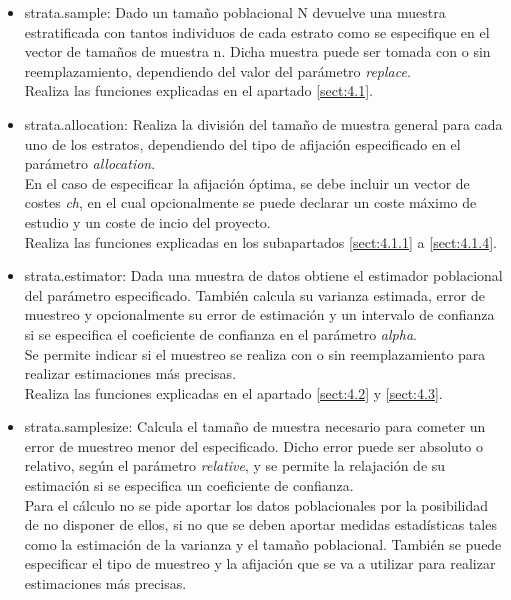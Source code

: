 \begin{itemize}[label=$\bullet$]
    \item strata.sample: Dado un tamaño poblacional N devuelve una muestra estratificada con tantos individuos de cada estrato como se especifique en el vector de tamaños de muestra n. Dicha muestra puede ser tomada con o sin reemplazamiento, dependiendo del valor del parámetro \textit{replace}.\\

    Realiza las funciones explicadas en el apartado \ref{sect:4.1}.

    \item strata.allocation: Realiza la división del tamaño de muestra general para cada uno de los estratos, dependiendo del tipo de afijación especificado en el parámetro \textit{allocation}.\\

    En el caso de especificar la afijación óptima, se debe incluir un vector de costes \textit{ch}, en el cual opcionalmente se puede declarar un coste máximo de estudio y un coste de incio del proyecto.\\

    Realiza las funciones explicadas en los subapartados \ref{sect:4.1.1} a \ref{sect:4.1.4}.


    \item strata.estimator: Dada una muestra de datos obtiene el estimador poblacional del parámetro especificado. También calcula su varianza estimada, error de muestreo y opcionalmente su error de estimación y un intervalo de confianza si se especifica el coeficiente de confianza en el parámetro \textit{alpha}. \\

    Se permite indicar si el muestreo se realiza con o sin reemplazamiento para realizar estimaciones más precisas.\\

    Realiza las funciones explicadas en el apartado \ref{sect:4.2} y \ref{sect:4.3}.

    \item strata.samplesize: Calcula el tamaño de muestra necesario para cometer un error de muestreo menor del especificado. Dicho error puede ser absoluto o relativo, según el parámetro \textit{relative}, y se permite la relajación de su estimación si se especifica un coeficiente de confianza. \\

    Para el cálculo no se pide aportar los datos poblacionales por la posibilidad de no disponer de ellos, si no que se deben aportar medidas estadísticas tales como la estimación de la varianza y el tamaño poblacional. También se puede especificar el tipo de muestreo y la afijación que se va a utilizar para realizar estimaciones más precisas.\\


\end{itemize}

